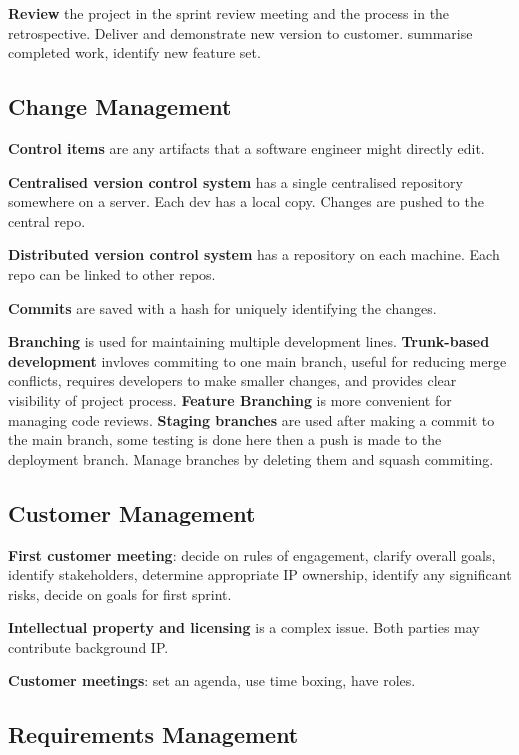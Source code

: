 \documentclass{article}
\begin{document}
\noindent \textbf{Review} the project in the sprint review meeting and the process in the retrospective. Deliver and demonstrate new version to customer.
summarise completed work, identify new feature set.


\subsection*{Change Management}

\noindent \textbf{Control items} are any artifacts that a software engineer might directly edit.

\noindent \textbf{Centralised version control system} has a single centralised repository somewhere on a server.
Each dev has a local copy. Changes are pushed to the central repo.

\noindent \textbf{Distributed version control system} has a repository on each machine.
Each repo can be linked to other repos.

\noindent \textbf{Commits} are saved with a hash for uniquely identifying the changes.

\noindent \textbf{Branching} is used for maintaining multiple development lines.
\textbf{Trunk-based development} invloves commiting to one main branch, useful for reducing merge conflicts, requires developers to make smaller changes,
and provides clear visibility of project process.
\textbf{Feature Branching} is more convenient for managing code reviews.
\textbf{Staging branches} are used after making a commit to the main branch, some testing is done here then a push is made to the deployment branch.
Manage branches by deleting them and squash commiting.


\subsection*{Customer Management}

\noindent \textbf{First customer meeting}: decide on rules of engagement, clarify overall goals, identify stakeholders, determine appropriate IP ownership,
identify any significant risks, decide on goals for first sprint.

\noindent \textbf{Intellectual property and licensing} is a complex issue. Both parties may contribute background IP.\@

\noindent \textbf{Customer meetings}: set an agenda, use time boxing, have roles.


\subsection*{Requirements Management}
\end{document}
